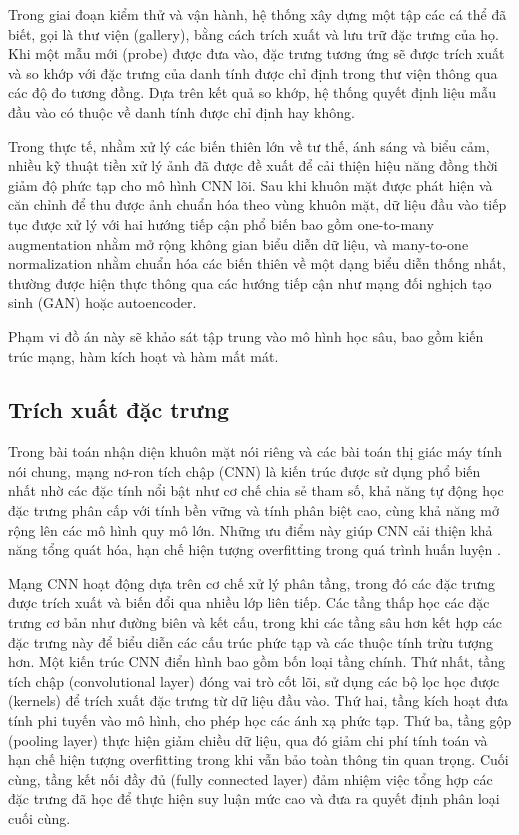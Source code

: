 Trong giai đoạn kiểm thử và vận hành, hệ thống xây dựng một tập các cá thể đã biết, gọi là thư viện (gallery), bằng cách trích xuất và lưu trữ đặc trưng của họ. Khi một mẫu mới (probe) được đưa vào, đặc trưng tương ứng sẽ được trích xuất và so khớp với đặc trưng của danh tính được chỉ định trong thư viện thông qua các độ đo tương đồng. Dựa trên kết quả so khớp, hệ thống quyết định liệu mẫu đầu vào có thuộc về danh tính được chỉ định hay không.

Trong thực tế, nhằm xử lý các biến thiên lớn về tư thế, ánh sáng và biểu cảm, nhiều kỹ thuật tiền xử lý ảnh đã được đề xuất để cải thiện hiệu năng đồng thời giảm độ phức tạp cho mô hình CNN lõi. Sau khi khuôn mặt được phát hiện và căn chỉnh để thu được ảnh chuẩn hóa theo vùng khuôn mặt, dữ liệu đầu vào tiếp tục được xử lý với hai hướng tiếp cận phổ biến bao gồm one-to-many augmentation nhằm mở rộng không gian biểu diễn dữ liệu, và many-to-one normalization nhằm chuẩn hóa các biến thiên về một dạng biểu diễn thống nhất, thường được hiện thực thông qua các hướng tiếp cận như mạng đối nghịch tạo sinh (GAN) hoặc autoencoder\cite{20_WANG2021215}.

Phạm vi đồ án này sẽ khảo sát tập trung vào mô hình học sâu, bao gồm kiến trúc mạng, hàm kích hoạt và hàm mất mát.
\subsection{Trích xuất đặc trưng}
Trong bài toán nhận diện khuôn mặt nói riêng và các bài toán thị giác máy tính nói chung, mạng nơ-ron tích chập (CNN) là kiến trúc được sử dụng phổ biến nhất nhờ các đặc tính nổi bật như cơ chế chia sẻ tham số, khả năng tự động học đặc trưng phân cấp với tính bền vững và tính phân biệt cao, cùng khả năng mở rộng lên các mô hình quy mô lớn. Những ưu điểm này giúp CNN cải thiện khả năng tổng quát hóa, hạn chế hiện tượng overfitting trong quá trình huấn luyện \cite{27_alzubaidi_2021_review,20_WANG2021215}.

Mạng CNN hoạt động dựa trên cơ chế xử lý phân tầng, trong đó các đặc trưng được trích xuất và biến đổi qua nhiều lớp liên tiếp. Các tầng thấp học các đặc trưng cơ bản như đường biên và kết cấu, trong khi các tầng sâu hơn kết hợp các đặc trưng này để biểu diễn các cấu trúc phức tạp và các thuộc tính trừu tượng hơn. Một kiến trúc CNN điển hình bao gồm bốn loại tầng chính. Thứ nhất, tầng tích chập (convolutional layer) đóng vai trò cốt lõi, sử dụng các bộ lọc học được (kernels) để trích xuất đặc trưng từ dữ liệu đầu vào. Thứ hai, tầng kích hoạt đưa tính phi tuyến vào mô hình, cho phép học các ánh xạ phức tạp. Thứ ba, tầng gộp (pooling layer) thực hiện giảm chiều dữ liệu, qua đó giảm chi phí tính toán và hạn chế hiện tượng overfitting trong khi vẫn bảo toàn thông tin quan trọng. Cuối cùng, tầng kết nối đầy đủ (fully connected layer) đảm nhiệm việc tổng hợp các đặc trưng đã học để thực hiện suy luận mức cao và đưa ra quyết định phân loại cuối cùng.

